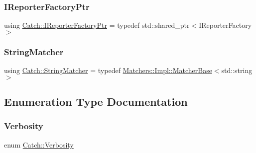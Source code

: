 \subsubsection{\texorpdfstring{IReporterFactoryPtr}{IReporterFactoryPtr}}
{\footnotesize\ttfamily using \mbox{\hyperlink{namespace_catch_ad1b36ac40c2739e52fd453dcdddf0d09}{Catch\+::\+I\+Reporter\+Factory\+Ptr}} = typedef std\+::shared\+\_\+ptr$<$I\+Reporter\+Factory$>$}

\mbox{\label{namespace_catch_aba438977e831821a2eeca82b9b4f4af2}} 
\subsubsection{\texorpdfstring{StringMatcher}{StringMatcher}}
{\footnotesize\ttfamily using \mbox{\hyperlink{namespace_catch_aba438977e831821a2eeca82b9b4f4af2}{Catch\+::\+String\+Matcher}} = typedef \mbox{\hyperlink{struct_catch_1_1_matchers_1_1_impl_1_1_matcher_base}{Matchers\+::\+Impl\+::\+Matcher\+Base}}$<$std\+::string$>$}



\subsection{Enumeration Type Documentation}
\mbox{\label{namespace_catch_af85c0d46dfe687d923a157362fd07737}} 
\subsubsection{\texorpdfstring{Verbosity}{Verbosity}}
{\footnotesize\ttfamily enum \mbox{\hyperlink{namespace_catch_af85c0d46dfe687d923a157362fd07737}{Catch\+::\+Verbosity}}\hspace{0.3cm}{\ttfamily [strong]}}

